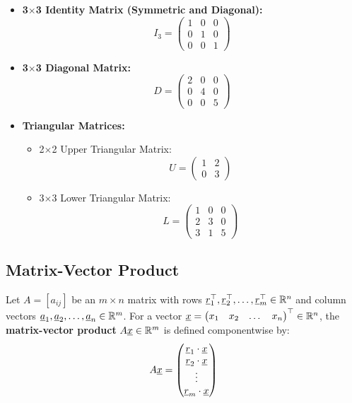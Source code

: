 \newpage
\begin{example}
    \begin{itemize}
        \item \textbf{3$\times$3 Identity Matrix (Symmetric and Diagonal):}
            \[
                I_3 = \begin{pmatrix} 1 & 0 & 0 \\ 0 & 1 & 0 \\ 0 & 0 & 1 \end{pmatrix}
            \]
        \item \textbf{3$\times$3 Diagonal Matrix:}
            \[
                D = \begin{pmatrix} 2 & 0 & 0 \\ 0 & 4 & 0 \\ 0 & 0 & 5 \end{pmatrix}
            \]
        \item \textbf{Triangular Matrices:}
            \begin{itemize}
                \item 2$\times$2 Upper Triangular Matrix:
                    \[
                        U = \begin{pmatrix} 1 & 2 \\ 0 & 3 \end{pmatrix}
                    \]
                \item 3$\times$3 Lower Triangular Matrix:
                    \[
                        L = \begin{pmatrix} 1 & 0 & 0 \\ 2 & 3 & 0 \\ 3 & 1 & 5 \end{pmatrix}
                    \]
            \end{itemize}
    \end{itemize}
\end{example}

\subsection{Matrix-Vector Product}

\begin{definition}
    Let $A = [a_{ij}]$ be an $m \times n$ matrix with rows $\underline{r}_1^{\top}, \underline{r}_2^{\top}, \dots, \underline{r}_m^{\top} \in \mathbb{R}^n$ and column vectors $\underline{a}_1, \underline{a}_2, \dots, \underline{a}_n \in \mathbb{R}^m$. For a vector $\underline{x} = \begin{pmatrix} x_1 & x_2 & \dots & x_n \end{pmatrix}^{\top} \in \mathbb{R}^n$, the \textbf{matrix-vector product} $A\underline{x} \in \mathbb{R}^m$ is defined componentwise by:
    \[
        A\underline{x} = \begin{pmatrix} \underline{r}_1 \cdot \underline{x} \\ \underline{r}_2 \cdot \underline{x} \\ \vdots \\ \underline{r}_m \cdot \underline{x} \end{pmatrix}
    \]
\end{definition}

